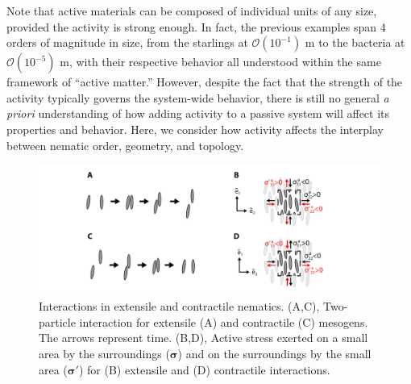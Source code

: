 Note that active materials can be composed of individual units of any size, provided the activity is strong enough.
In fact, the previous examples span 4 orders of magnitude in size, from the starlings at $\mathcal{O}(10^{-1})$ m to the bacteria at $\mathcal{O}(10^{-5})$ m, with their respective behavior all understood within the same framework of ``active matter.''
However, despite the fact that the strength of the activity typically governs the system-wide behavior, there is still no general \emph{a priori} understanding of how adding activity to a passive system will affect its properties and behavior.
Here, we consider how activity affects the interplay between nematic order, geometry, and topology.
\begin{figure}
  \centering
  \includegraphics{figures/C3/Ch3-Figs_ActiveInteraction.png}
  \caption{Interactions in extensile and contractile nematics.
  (A,C), Two-particle interaction for extensile (A) and contractile (C) mesogens.
  The arrows represent time.
  (B,D), Active stress exerted on a small area by the surroundings ($\bm{\sigma}$) and on the surroundings by the small area ($\bm{\sigma}'$) for (B) extensile and (D) contractile interactions.
  }\label{f:3-ActiveInteraction}
\end{figure}


